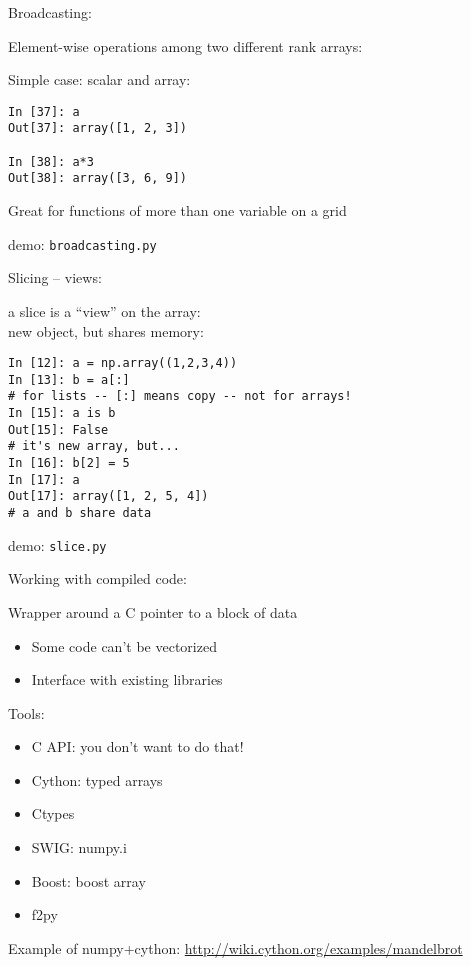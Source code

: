 \documentclass{beamer}
\begin{document}
\begin{frame}[fragile]{Broadcasting:}

{\Large Element-wise operations among two different rank arrays:}

\vfill
{\Large Simple case: scalar and array:}

\begin{verbatim}
In [37]: a
Out[37]: array([1, 2, 3])

In [38]: a*3
Out[38]: array([3, 6, 9])
\end{verbatim}

{\Large Great for functions of more than one variable on a grid}

\vfill
{\large demo: \verb|broadcasting.py|}
\end{frame} 

\begin{frame}[fragile]{Slicing -- views:}

{\Large a slice is a ``view'' on the array:\\
new object, but shares memory:}

\begin{verbatim}
In [12]: a = np.array((1,2,3,4))
In [13]: b = a[:]
# for lists -- [:] means copy -- not for arrays!
In [15]: a is b
Out[15]: False
# it's new array, but...
In [16]: b[2] = 5
In [17]: a
Out[17]: array([1, 2, 5, 4])
# a and b share data
\end{verbatim}

\vfill
{\large demo: \verb|slice.py|}
\end{frame} 


\begin{frame}[fragile]{Working with compiled code:}

{\Large Wrapper around a C pointer to a block of data}

\begin{itemize}
  \item Some code can't be vectorized
  \item Interface with existing libraries
\end{itemize}

\vfill
{\Large Tools:}
\begin{itemize}
  \item C API: you don't want to do that!
  \item Cython: typed arrays
  \item Ctypes 
  \item SWIG: numpy.i 
  \item Boost: boost array
  \item f2py
\end{itemize}

\vfill
Example of numpy+cython: \url{http://wiki.cython.org/examples/mandelbrot}
\end{frame} 
\end{document}
